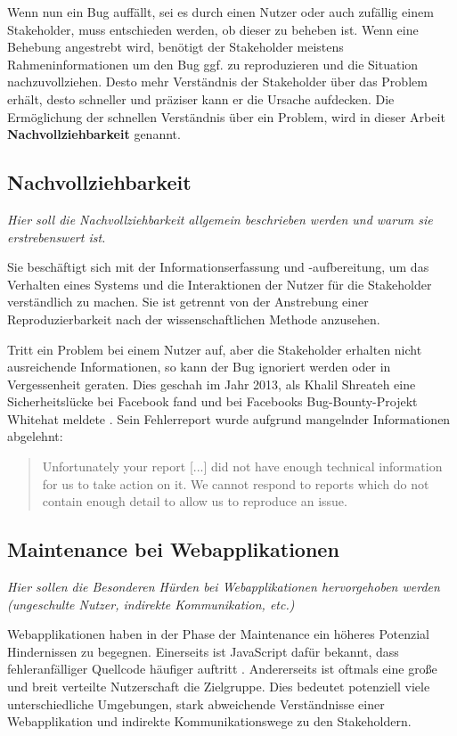 	Wenn nun ein Bug auffällt, sei es durch einen Nutzer oder auch zufällig einem Stakeholder, muss entschieden werden, ob dieser zu beheben ist. Wenn eine Behebung angestrebt wird, benötigt der Stakeholder meistens Rahmeninformationen \cite{WhatMakesAGoodBugReport} um den Bug ggf. zu reproduzieren und die Situation nachzuvollziehen. Desto mehr Verständnis der Stakeholder über das Problem erhält, desto schneller und präziser kann er die Ursache aufdecken. Die Ermöglichung der schnellen Verständnis über ein Problem, wird in dieser Arbeit \textbf{Nachvollziehbarkeit} genannt.

\subsection{Nachvollziehbarkeit}

	\textit{Hier soll die Nachvollziehbarkeit allgemein beschrieben werden und warum sie erstrebenswert ist.}

	Sie beschäftigt sich mit der Informationserfassung und -aufbereitung, um das Verhalten eines Systems und die Interaktionen der Nutzer für die Stakeholder verständlich zu machen. Sie ist getrennt von der Anstrebung einer Reproduzierbarkeit nach der wissenschaftlichen Methode anzusehen.
	
	{\color{red}\textit{\lipsum[1]}}
	
	Tritt ein Problem bei einem Nutzer auf, aber die Stakeholder erhalten nicht ausreichende Informationen, so kann der Bug ignoriert werden oder in Vergessenheit geraten. Dies geschah im Jahr 2013, als Khalil Shreateh eine Sicherheitslücke bei Facebook fand und bei Facebooks Bug-Bounty-Projekt Whitehat meldete \cite{FacebookBugBounyHunt}. Sein Fehlerreport wurde aufgrund mangelnder Informationen abgelehnt:
	
	\begin{quotation}
	Unfortunately your report [...] did not have enough technical information for us to take action  on  it. We  cannot  respond  to  reports  which  do  not contain enough detail to allow us to reproduce an issue.
	\end{quotation}

\subsection{Maintenance bei Webapplikationen}

	\textit{Hier sollen die Besonderen Hürden bei Webapplikationen hervorgehoben werden (ungeschulte Nutzer, indirekte Kommunikation, etc.)}
	
	Webapplikationen haben in der Phase der Maintenance ein höheres Potenzial Hindernissen zu begegnen. Einerseits  ist JavaScript dafür bekannt, dass fehleranfälliger Quellcode häufiger auftritt \cite{BuildingStableWebApplications} \cite{BugsJSABenchmarkOfJavaScriptBugs}. Andererseits ist oftmals eine große und breit verteilte Nutzerschaft die Zielgruppe. Dies bedeutet potenziell viele unterschiedliche Umgebungen, stark abweichende Verständnisse einer Webapplikation und indirekte Kommunikationswege zu den Stakeholdern.